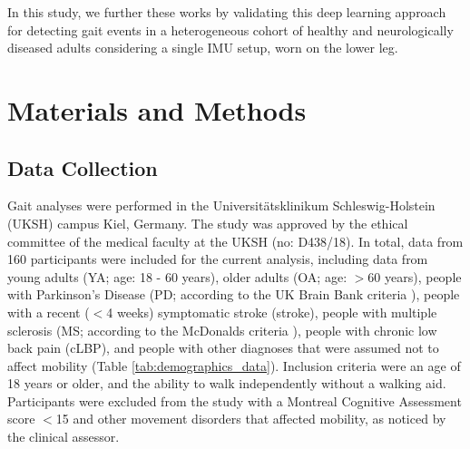 \documentclass[sensors,article,submit,pdftex,moreauthors]{Definitions/mdpi}
\begin{document}
In this study, we further these works by validating this deep learning approach for detecting gait events in a heterogeneous cohort of healthy and neurologically diseased adults considering a single IMU setup, worn on the lower leg.
\section{Materials and Methods \label{sec:Materials_and_Methods}}
\subsection{Data Collection \label{subsec:Data_Collection}}
Gait analyses were performed in the Universit\"{a}tsklinikum Schleswig-Holstein (UKSH) campus Kiel, Germany. The study \cite{Warmerdam2021} was approved by the ethical committee of the medical faculty at the UKSH (no: D438/18). In total, data from 160 participants were included for the current analysis, including data from young adults (YA; age: 18 - 60 years), older adults (OA; age: $>$60 years), people with Parkinson's Disease (PD; according to the UK Brain Bank criteria \cite{Gibb1988}), people with a recent ($<$4 weeks) symptomatic stroke (stroke), people with multiple sclerosis (MS; according to the McDonalds criteria \cite{Thompson2018}), people with chronic low back pain (cLBP), and people with other diagnoses that were assumed not to affect mobility (Table \ref{tab:demographics_data}). Inclusion criteria were an age of 18 years or older, and the ability to walk independently without a walking aid. Participants were excluded from the study with a Montreal Cognitive Assessment \cite{Nasreddine2005} score $<$15 and other movement disorders that affected mobility, as noticed by the clinical assessor.
\end{document}
